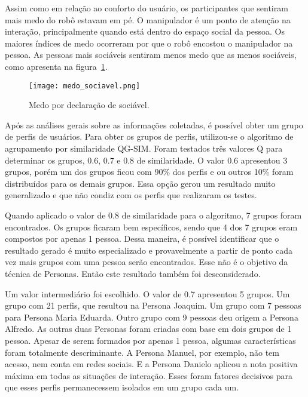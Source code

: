 Assim como em relação ao conforto do usuário, os participantes que sentiram mais medo do robô estavam em pé. O manipulador é um ponto de atenção na interação, principalmente quando está dentro do espaço social da pessoa. Os maiores índices de medo ocorreram por que o robô encostou o manipulador na pessoa. As pessoas mais sociáveis sentiram menos medo que as menos sociáveis, como apresenta na figura~\ref{fig:medosociavel}.

\begin{figure}[ht!]
	\centering
	\begin{minipage}{0.65\textwidth}
		\caption{Medo por declaração de sociável.}
		\texttt{[image: medo\_sociavel.png]}
		\label{fig:medosociavel}
	\end{minipage}
\end{figure}

Após as análises gerais sobre as informações coletadas, é possível obter um grupo de perfis de usuários. Para obter os grupos de perfis, utilizou-se o algoritmo de agrupamento por similaridade QG-SIM. Foram testados três valores Q para determinar os grupos, 0.6, 0.7 e 0.8 de similaridade. O valor 0.6 apresentou 3 grupos, porém um dos grupos ficou com 90\% dos perfis e ou outros 10\% foram distribuídos para os demais grupos. Essa opção gerou um resultado muito generalizado e que não condiz com os perfis que realizaram os testes.

Quando aplicado o valor de 0.8 de similaridade para o algoritmo, 7 grupos foram encontrados. Os grupos ficaram bem específicos, sendo que 4 dos 7 grupos eram compostos por apenas 1 pessoa. Dessa maneira, é possível identificar que o resultado gerado é muito especializado e provavelmente a partir de ponto cada vez mais grupos com uma pessoa serão encontrados. Esse não é o objetivo da técnica de Personas. Então este resultado também foi desconsiderado.

Um valor intermediário foi escolhido. O valor de 0.7 apresentou 5 grupos. Um grupo com 21 perfis, que resultou na Persona Joaquim. Um grupo com 7 pessoas para Persona Maria Eduarda. Outro grupo com 9 pessoas deu origem a Persona Alfredo. As outras duas Personas foram criadas com base em dois grupos de 1 pessoa. Apesar de serem formados por apenas 1 pessoa, algumas características foram totalmente descriminante. A Persona Manuel, por exemplo, não tem acesso, nem conta em redes sociais. E a Persona Danielo aplicou a nota positiva máxima em todas as situações de interação. Esses foram fatores decisivos para que esses perfis permanecessem isolados em um grupo cada um.


